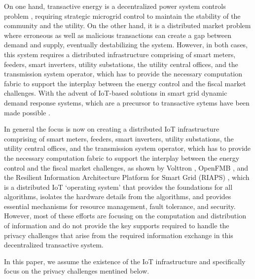 On one hand, transactive energy is a decentralized power system controls problem \cite{7452738}, requiring strategic microgrid control to maintain the stability of the community and the utility. On the other hand, it is a distributed market problem where erroneous as well as malicious transactions can create a gap between demand and supply, eventually destabilizing the system. However, in both cases, this system requires a distributed  infrastructure comprising of smart meters, feeders, smart inverters, utility substations, the utility central offices, and the transmission system operator, which has to provide the necessary computation fabric to support the interplay between the energy control and the fiscal market challenges. With the advent of IoT-based solutions in smart grid  dynamic demand response systems, which are a precursor to transactive sytems have been made possible \cite{Haider2016166}. 

In general the focus is now on creating a distributed  IoT infrastructure comprising of smart meters, feeders, smart inverters, utility substations, the utility central offices, and the transmission system operator, which has to provide the necessary computation fabric to support the interplay between the energy control and the fiscal market challenges, as shown by Volttron \cite{katipamula2016volttron},  OpenFMB \cite{gunthersmart}, and the Resilient Information Architecture Platform for Smart Grid (RIAPS) \cite{eisele2017riaps}\cite{Scott2017ICCPS}, which is a distributed IoT  `operating system' that provides the foundations for all algorithms, isolates the hardware details from the algorithms, and provides essential mechanisms for resource management, fault tolerance, and security. However, most of these efforts are focusing on the computation and distribution of information and do not provide the key supports required to handle the privacy challenges that arise from the required information exchange in this decentralized transactive system. 


In this paper, we assume the existence of the IoT infrastructure and specifically focus on the privacy challenges mentined below. 



